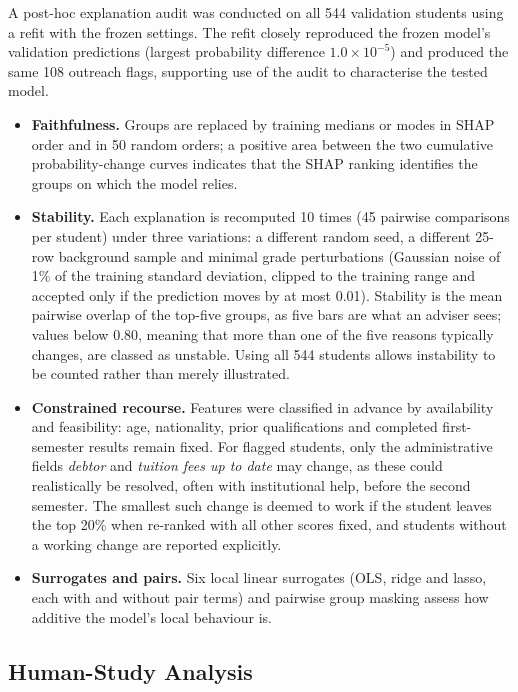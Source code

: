 A post-hoc explanation audit was conducted on all 544 validation students using a \tabicl refit
with the frozen settings. The refit closely reproduced the frozen model's validation predictions
(largest probability difference $1.0\times10^{-5}$) and produced the same 108 outreach flags,
supporting use of the audit to characterise the tested model.
\begin{itemize}[nosep,leftmargin=*]
  \item \textbf{Faithfulness.} Groups are replaced by training medians or modes in SHAP order and in
  50 random orders; a positive area between the two cumulative probability-change curves indicates
  that the SHAP ranking identifies the groups on which the model relies.
  \item \textbf{Stability.} Each explanation is recomputed 10 times (45 pairwise comparisons per
  student) under three variations: a different random seed, a different 25-row background sample
  and minimal grade perturbations (Gaussian noise of 1\% of the training standard deviation, clipped
  to the training range and accepted only if the prediction moves by at most 0.01). Stability is the
  mean pairwise overlap of the top-five groups, as five bars are what an adviser sees; values below
  0.80, meaning that more than one of the five reasons typically changes, are classed as unstable.
  Using all 544 students allows instability to be counted rather than merely illustrated.
  \item \textbf{Constrained recourse.} Features were classified in advance by availability and
  feasibility: age, nationality, prior qualifications and completed first-semester results remain
  fixed. For flagged students, only the administrative fields \emph{debtor} and \emph{tuition fees
  up to date} may change, as these could realistically be resolved, often with institutional help,
  before the second semester. The smallest such change is deemed to work if the student leaves the
  top 20\% when re-ranked with all other scores fixed, and students without a working change are
  reported explicitly.
  \item \textbf{Surrogates and pairs.} Six local linear surrogates (OLS, ridge and lasso, each with
  and without pair terms) and pairwise group masking assess how additive the model's local behaviour
  is.
\end{itemize}

\subsection{Human-Study Analysis}

